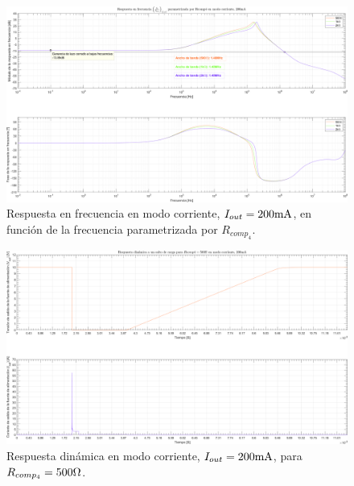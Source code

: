 \clearpage

\begin{figure}[H] %
\begin{center}
\includegraphics[width=1.1 \textwidth, angle=90]{./img/plots/rf/power_supply_RCOMP4_RF_Modo4.png}
\caption{\label{fig:fig_power_supply_RCOMP4_RF_Modo4}\footnotesize{Respuesta en frecuencia en modo corriente, $I_{out} = 200 \si[per-mode=symbol]{\milli\ampere}$, en función de la frecuencia parametrizada por $R_{comp_{4}}$.}}
\end{center}
\end{figure}

\clearpage

\begin{figure}[H] %
\begin{center}
\includegraphics[width=1.1 \textwidth, angle=90]{./img/plots/dynamic/power_supply_RCOMP4_500_STEP_Modo4.png}
\caption{\label{fig:fig_power_supply_RCOMP4_STEP_500_Modo4}\footnotesize{Respuesta dinámica en modo corriente, $I_{out} = 200 \si[per-mode=symbol]{\milli\ampere}$, para $R_{comp_{4}} = 500 \si[per-mode=symbol]{\ohm} $.}}
\end{center}
\end{figure}

